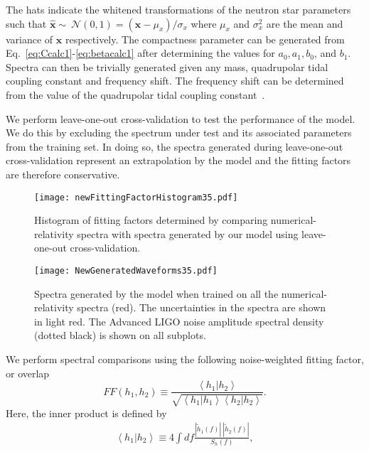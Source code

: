 \documentclass[../Thesis.tex]{subfiles}
\begin{document}
       \noindent The hats indicate the whitened transformations of the neutron star parameters such that $\widehat{\mathbf{x}}\sim~ \mathcal{N}(0,1)=( \mathbf{x}-\mu_x)/\sigma_x$ where $\mu_x$ and $\sigma_x^2$ are the mean and variance of $\mathbf{x}$ respectively. The compactness parameter can be generated from Eq.~\ref{eq:Ccalc1}-\ref{eq:betacalc1} after determining the values for $a_0, a_1, b_0$, and $b_1$. Spectra can then be trivially generated given any mass, quadrupolar tidal coupling constant and frequency shift. The frequency shift can be determined from the value of the quadrupolar tidal coupling constant~\cite{Bernuzzi2015,Takami2015}. \par
       We perform leave-one-out cross-validation to test the performance of the model. We do this by excluding the spectrum under test and its associated parameters from the training set. In doing so, the spectra generated during leave-one-out cross-validation represent an extrapolation by the model  and the fitting factors are therefore conservative.
       \par
    \begin{figure}[H]
          \texttt{[image: newFittingFactorHistogram35.pdf]}  
          \caption{Histogram of fitting factors determined by comparing numerical-relativity spectra with spectra generated by our model using leave-one-out cross-validation.}
          \label{fig:FittingFactorsHistogram}
    \end{figure}   
    \begin{figure*}
        \texttt{[image: NewGeneratedWaveforms35.pdf]} 
        \caption{ Spectra generated by the model when trained on all the numerical-relativity spectra (red). The uncertainties in the spectra are shown in light red. The Advanced LIGO noise amplitude spectral density (dotted black) is shown on all subplots.}
        \label{fig:GeneratedWaveforms}
    \end{figure*}      
       We perform spectral comparisons using the following noise-weighted fitting factor, or overlap~\cite{Apostolatos95}
        \begin{equation}
        	FF(h_{1},h_{2})\equiv\frac{\left<h_{1}|h_{2}\right>}{\sqrt{\left<h_{1}|h_{1}\right>\left<h_{2}|h_{2}\right>}}.\label{eq:FF1}
        \end{equation}
        Here, the inner product is defined by
        \begin{align}
        	\left<h_1|h_2\right>\equiv4 \int df\frac{|\tilde{h}_1(f)|\ |\tilde{h}_2(f)|}{S_h(f)},
        \end{align}
\end{document}
